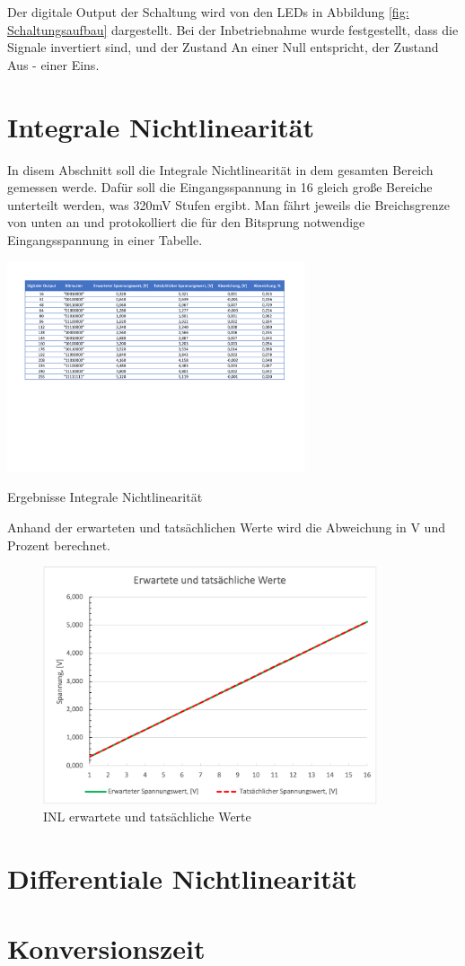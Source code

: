 Der digitale Output der Schaltung wird von den \acs{LED}s in Abbildung 
\ref{fig: Schaltungsaufbau} dargestellt.
Bei der Inbetriebnahme wurde festgestellt, dass die Signale invertiert sind, 
und der Zustand An einer Null entspricht, der Zustand Aus - einer Eins.

\section{Integrale Nichtlinearität}

In disem Abschnitt soll die Integrale Nichtlinearität in dem gesamten Bereich gemessen
werde. Dafür soll die Eingangsspannung in 16 gleich große Bereiche unterteilt werden, was 
320mV Stufen ergibt. Man fährt jeweils die Breichsgrenze von unten an und protokolliert 
die für den Bitsprung notwendige Eingangsspannung in einer Tabelle.


\begin{table}[H]
	\centering
	\includegraphics[height=6.2cm]{images/Versuch1d.pdf} 
	\caption[]{Ergebnisse Integrale Nichtlinearität}
	\label{fig: Ergebnisse Integrale Nichtlinearität}
\end{table}

Anhand der erwarteten und tatsächlichen Werte wird die Abweichung in V und Prozent
 berechnet.



 \begin{figure}[H]
	\centering
	\includegraphics[height=7cm]{images/INL_gerade.png} 
	\caption[]{INL erwartete und tatsächliche Werte}
	\label{fig: INL erwartete und tatsächliche Werte}
\end{figure}

\section{Differentiale Nichtlinearität}
\section{Konversionszeit}
